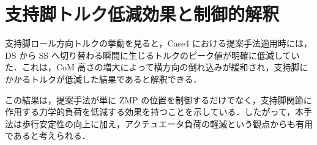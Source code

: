 \section{支持脚トルク低減効果と制御的解釈}
\label{sec:discussion_torque}

支持脚ロール方向トルクの挙動を見ると，Case4 における提案手法適用時には，DS から SS へ切り替わる瞬間に生じるトルクのピーク値が明確に低減していた．これは，CoM 高さの増大によって横方向の倒れ込みが緩和され，支持脚にかかるトルクが低減した結果であると解釈できる．

この結果は，提案手法が単に ZMP の位置を制御するだけでなく，支持脚関節に作用する力学的負荷を低減する効果を持つことを示している．したがって，本手法は歩行安定性の向上に加え，アクチュエータ負荷の軽減という観点からも有用であると考えられる．